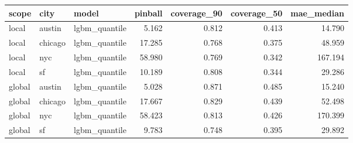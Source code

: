 \begin{tabular}{lllrrrr}
\toprule
scope & city & model & pinball & coverage\_90 & coverage\_50 & mae\_median \\
\midrule
local & austin & lgbm\_quantile & 5.162 & 0.812 & 0.413 & 14.790 \\
local & chicago & lgbm\_quantile & 17.285 & 0.768 & 0.375 & 48.959 \\
local & nyc & lgbm\_quantile & 58.980 & 0.769 & 0.342 & 167.194 \\
local & sf & lgbm\_quantile & 10.189 & 0.808 & 0.344 & 29.286 \\
global & austin & lgbm\_quantile & 5.028 & 0.871 & 0.485 & 15.240 \\
global & chicago & lgbm\_quantile & 17.667 & 0.829 & 0.439 & 52.498 \\
global & nyc & lgbm\_quantile & 58.423 & 0.813 & 0.426 & 170.399 \\
global & sf & lgbm\_quantile & 9.783 & 0.748 & 0.395 & 29.892 \\
\bottomrule
\end{tabular}

